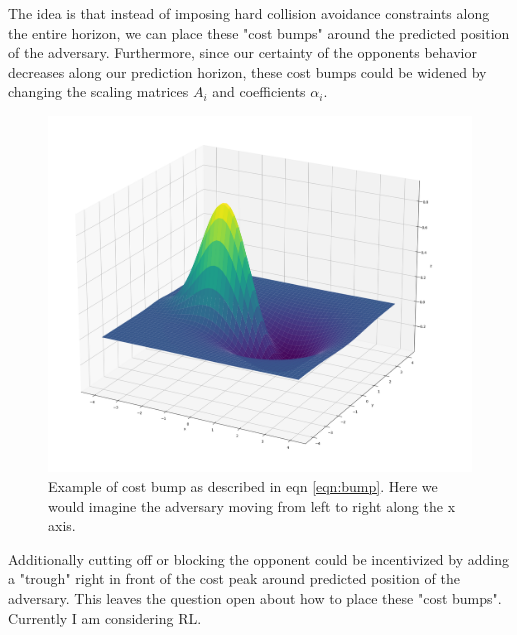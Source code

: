 \documentclass[12pt]{article}
\begin{document}
The idea is that instead of imposing hard collision avoidance constraints along the entire horizon, we can place these "cost bumps" around the predicted position of the adversary. Furthermore, since our certainty of the opponents behavior decreases along our prediction horizon, these cost bumps could be widened by changing the scaling matrices $A_i$ and coefficients $\alpha_i$. 
\begin{figure}[h!]
	\centering
	\includegraphics[width = 0.5\linewidth]{fig/cost_bump.png}
	\caption{Example of cost bump as described in eqn \ref{eqn:bump}. Here we would imagine the adversary moving from left to right along the x axis.  }
\end{figure}
Additionally cutting off or blocking the opponent could be incentivized by adding a "trough" right in front of the cost peak around predicted position of the adversary.  This leaves the question open about how to place these "cost bumps". Currently I am considering RL.



\end{document}
